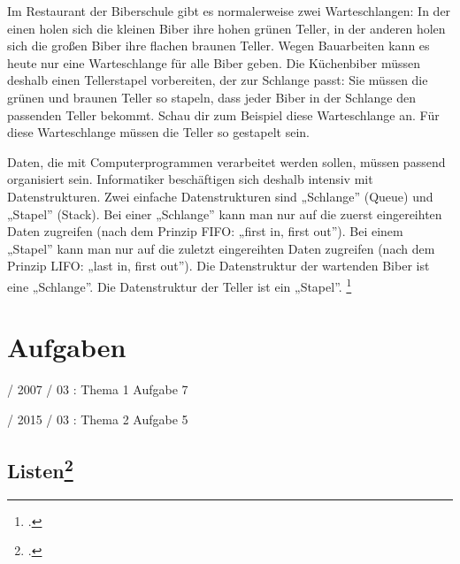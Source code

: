 \documentclass{lehramt-informatik-haupt}
\begin{document}
Im Restaurant der Biberschule gibt es normalerweise zwei Warteschlangen:
In der einen holen sich die kleinen Biber ihre hohen grünen Teller, in
der anderen holen sich die großen Biber ihre flachen braunen Teller.
Wegen Bauarbeiten kann es heute nur eine Warteschlange für alle Biber
geben. Die Küchenbiber müssen deshalb einen Tellerstapel vorbereiten,
der zur Schlange passt: Sie müssen die grünen und braunen Teller so
stapeln, dass jeder Biber in der Schlange den passenden Teller bekommt.
Schau dir zum Beispiel diese Warteschlange an. Für diese Warteschlange
müssen die Teller so gestapelt sein.

Daten, die mit Computerprogrammen verarbeitet werden sollen, müssen
passend organisiert sein. Informatiker beschäftigen sich deshalb
intensiv mit Datenstrukturen. Zwei einfache Datenstrukturen sind
„Schlange” (Queue) und „Stapel” (Stack). Bei einer „Schlange” kann man
nur auf die zuerst eingereihten Daten zugreifen (nach dem Prinzip FIFO:
„first in, first out”). Bei einem „Stapel” kann man nur auf die zuletzt
eingereihten Daten zugreifen (nach dem Prinzip LIFO: „last in, first
out”). Die Datenstruktur der wartenden Biber ist eine „Schlange”. Die
Datenstruktur der Teller ist ein „Stapel”.
\footcite[Seite 35]{net:pdf:informatik-biber-2010}


\chapter{Aufgaben}

%

 / 2007 / 03 : Thema 1 Aufgabe 7

%

 / 2015 / 03 : Thema 2 Aufgabe 5

%

\section{Listen\footcite[Aufgabe 3]{aud:e-klausur}}
\end{document}
